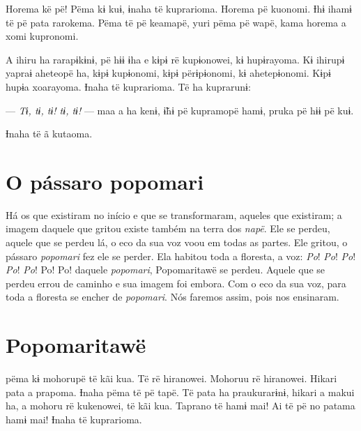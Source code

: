Horema kë pë! Pëma kɨ kuɨ, ɨnaha të kuprarioma. Horema pë kuonomi. Ɨhɨ
ihamɨ të pë pata rarokema. Pëma të pë keamapë, yuri pëma pë wapë, kama
horema a xomi kupronomi. 

A ihiru ha rarapɨkɨnɨ, pë hɨɨ ɨha e kɨpɨ rë kupɨonowei, kɨ hupɨrayoma.
Kɨ ihirupɨ yapraɨ aheteopë ha, kɨpɨ kupɨonomi, kɨpɨ përɨpɨonomi, kɨ
ahetepɨonomi. Kɨpɨ hupɨa xoarayoma. Ɨnaha të kuprarioma. Të ha
kuprarunɨ: 

--- \textit{Tɨ, tɨ, tɨ! tɨ, tɨ!} --- maa a ha kenɨ, ɨ̃hɨ pë kupramopë hamɨ, pruka
pë hɨɨ pë kuɨ. 

Ɨnaha të ã kutaoma.

\chapter{O pássaro popomari}

  

Há os que existiram no início e que se transformaram, aqueles que
existiram; a imagem daquele que gritou existe também na terra
dos \textit{napë}. Ele se perdeu, aquele que se perdeu lá, o eco da sua
voz voou em todas as partes. Ele gritou, o pássaro \textit{popomari} fez
ele se perder. Ela habitou toda a floresta, a voz: \textit{Po}! \textit{Po}! \textit{Po}! \textit{Po}! \textit{Po}!
Po! Po! daquele \textit{popomari}, Popomaritawë se perdeu. Aquele que se
perdeu errou de caminho e sua imagem foi embora. Com o eco da sua voz,
para toda a floresta se encher de \textit{popomari}. Nós faremos assim,
pois nos ensinaram. 


\chapter{Popomaritawë}
 
 pëma kɨ mohorupë të kãi kua. Të rë hiranowei. Mohoruu rë
hiranowei. Hikari pata a prapoma. Ɨnaha pëma të pë tapë. Të pata ha
praukurarɨnɨ, hikari a makui ha, a mohoru rë kukenowei, të kãi kua.
Taprano të hamɨ mai! Ai të pë no patama hamɨ mai! Ɨnaha të kuprarioma. 

